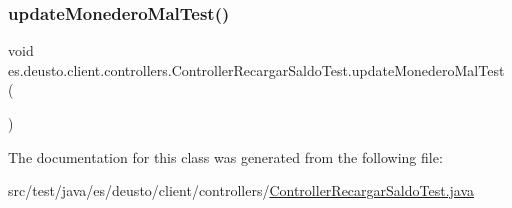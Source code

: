 \subsubsection{\texorpdfstring{updateMonederoMalTest()}{updateMonederoMalTest()}}
{\footnotesize\ttfamily void es.\+deusto.\+client.\+controllers.\+Controller\+Recargar\+Saldo\+Test.\+update\+Monedero\+Mal\+Test (\begin{DoxyParamCaption}{ }\end{DoxyParamCaption})}



The documentation for this class was generated from the following file\+:\begin{DoxyCompactItemize}
\item 
src/test/java/es/deusto/client/controllers/\mbox{\hyperlink{_controller_recargar_saldo_test_8java}{Controller\+Recargar\+Saldo\+Test.\+java}}\end{DoxyCompactItemize}
